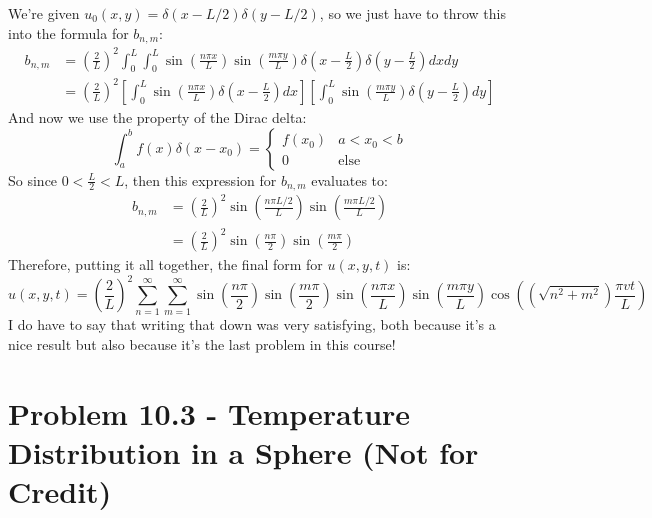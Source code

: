 \documentclass{article}
\begin{document}
\begin{solution}
	We're given $u_0(x, y) = \delta(x - L / 2) \delta(y - L / 2)$, so we just have to throw this 
	into the formula for $b_{n, m}$:
	\begin{align*}
		b_{n, m} &= \left( \frac{2}{L} \right)^2 \int_0^L \int_0^L \sin\left(\frac{n \pi x}{L} \right) 
		\sin(\frac{m \pi y}{L}) \delta\left(x - \frac{L}{2}\right) \delta\left(y - \frac{L}{2}\right) dx dy\\
				 &= \left( \frac{2}{L} \right)^2 
				 \left[\int_0^L \sin(\frac{n \pi x}{L})\delta\left(x - \frac{L}{2}\right) dx\right] 
				 \left[\int_0^L \sin(\frac{m \pi y}{L}) \delta\left( y - \frac{L}{2} \right) dy\right] 
	\end{align*}
	And now we use the property of the Dirac delta:
	\[
	\int_a^b f(x) \delta(x - x_0) = \begin{cases}
		f(x_0) & a < x_0 < b\\ 
		0 & \text{else}
	\end{cases}
	\] 
	So since $0 < \frac{L}{2} < L$, then this expression for $b_{n, m}$ evaluates to:
	\begin{align*}
		b_{n, m} &= \left( \frac{2}{L} \right)^2 \sin( \frac{n \pi L / 2}{L}) \sin(\frac{m \pi L / 2}{L})\\
				 &= \left(\frac{2}{L}\right)^2 \sin(\frac{n \pi}{2}) \sin(\frac{m \pi}{2})
	\end{align*} 
	Therefore, putting it all together, the final form for $u(x, y, t)$ is:
	\[
		u(x, y, t) = \left( \frac{2}{L} \right)^2\sum_{n = 1}^\infty \sum_{m = 1}^\infty \sin(\frac{n \pi}{2})
		\sin(\frac{m \pi}{2}) \sin(\frac{n \pi x}{L}) \sin(\frac{m \pi y}{L}) \cos(\left(\sqrt{n^2 + m^2}\right) \frac{\pi vt}{L})
	\] 
	I do have to say that writing that down was very satisfying, both because it's a nice result but also because
	it's the last problem in this course!
\end{solution}
\bigskip
\dphline
\pagebreak
\section*{Problem 10.3 - Temperature Distribution in a Sphere (Not for Credit)}
\end{document}
